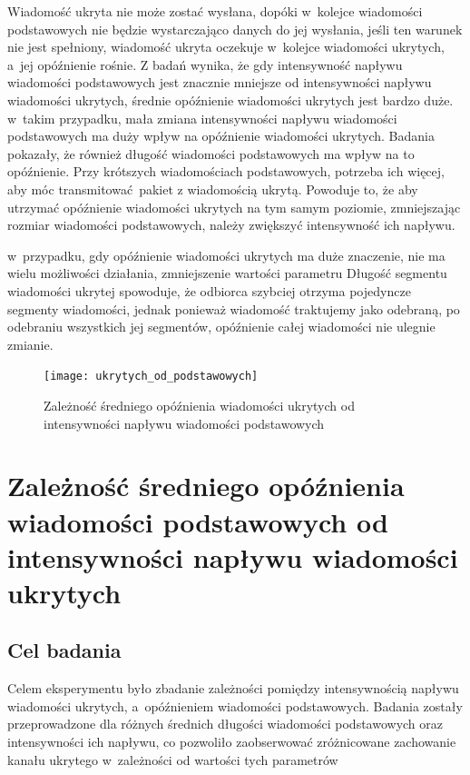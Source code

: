 \documentclass[a4paper, twoside, 12pt]{report}
\begin{document}
            Wiadomość ukryta nie może zostać wysłana, dopóki w~kolejce wiadomości
            podstawowych nie będzie wystarczająco danych do jej wysłania, jeśli ten
            warunek nie jest spełniony, wiadomość ukryta oczekuje w~kolejce wiadomości
            ukrytych, a~jej opóźnienie rośnie. Z badań wynika, że gdy intensywność
            napływu wiadomości podstawowych jest znacznie mniejsze od intensywności
            napływu wiadomości ukrytych, średnie opóźnienie wiadomości ukrytych jest
            bardzo duże. w~takim przypadku, mała zmiana intensywności napływu wiadomości
            podstawowych ma duży wpływ na opóźnienie wiadomości ukrytych. Badania
            pokazały, że również długość wiadomości podstawowych ma wpływ na to opóźnienie.
            Przy krótszych wiadomościach podstawowych, potrzeba ich więcej, aby móc
            transmitować pakiet z wiadomością ukrytą. Powoduje to, że aby utrzymać
            opóźnienie wiadomości ukrytych na tym samym poziomie, zmniejszając rozmiar
            wiadomości podstawowych, należy zwiększyć intensywność ich napływu.

            w~przypadku, gdy opóźnienie wiadomości ukrytych ma duże znaczenie,
            nie ma wielu możliwości działania, zmniejszenie wartości parametru Długość
            segmentu wiadomości ukrytej spowoduje, że odbiorca szybciej otrzyma
            pojedyncze segmenty wiadomości, jednak ponieważ wiadomość traktujemy jako odebraną,
            po odebraniu wszystkich jej segmentów, opóźnienie całej wiadomości
            nie ulegnie zmianie.

        \begin{figure}[h]
                \centering
                \texttt{[image: ukrytych\_od\_podstawowych]}
                \caption{Zależność średniego opóźnienia wiadomości ukrytych od
                    intensywności napływu wiadomości podstawowych}
                \label{OPOZNIENIEUKRYTYCHODPODSTAWOWYCH}
        \end{figure}

    \section{Zależność średniego opóźnienia wiadomości podstawowych od intensywności napływu wiadomości ukrytych} \label{OPOZNIENEPODSTAWOWYCHODUKRYTYCH}
        \subsection{Cel badania}
            Celem eksperymentu było zbadanie zależności pomiędzy intensywnością
            napływu wiadomości ukrytych, a~opóźnieniem wiadomości podstawowych.
            Badania zostały przeprowadzone dla różnych średnich długości wiadomości
            podstawowych oraz intensywności ich napływu, co pozwoliło zaobserwować
            zróżnicowane zachowanie kanału ukrytego w~zależności od wartości tych
            parametrów
\end{document}
